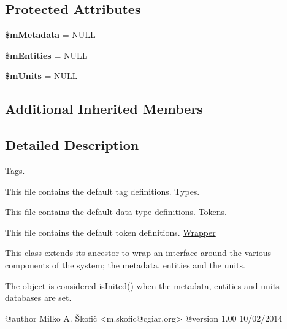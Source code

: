 \subsection*{Protected Attributes}
\begin{DoxyCompactItemize}
\item 
\hypertarget{class_ontology_wrapper_1_1_wrapper_a948081a4198321507da5b8e12976c606}{{\bfseries \$m\-Metadata} = N\-U\-L\-L}\label{class_ontology_wrapper_1_1_wrapper_a948081a4198321507da5b8e12976c606}

\item 
\hypertarget{class_ontology_wrapper_1_1_wrapper_afdfce5944ab839404cad14a166f7713b}{{\bfseries \$m\-Entities} = N\-U\-L\-L}\label{class_ontology_wrapper_1_1_wrapper_afdfce5944ab839404cad14a166f7713b}

\item 
\hypertarget{class_ontology_wrapper_1_1_wrapper_a7b23eb25ac51ad80722f7f8677e92202}{{\bfseries \$m\-Units} = N\-U\-L\-L}\label{class_ontology_wrapper_1_1_wrapper_a7b23eb25ac51ad80722f7f8677e92202}

\end{DoxyCompactItemize}
\subsection*{Additional Inherited Members}


\subsection{Detailed Description}
Tags.

This file contains the default tag definitions. Types.

This file contains the default data type definitions. Tokens.

This file contains the default token definitions. \hyperlink{class_ontology_wrapper_1_1_wrapper}{Wrapper}

This class extends its ancestor to wrap an interface around the various components of the system; the metadata, entities and the units.

The object is considered \hyperlink{}{is\-Inited()} when the metadata, entities and units databases are set. \begin{DoxyVerb} @author            Milko A. Škofič <m.skofic@cgiar.org>
 @version   1.00 10/02/2014\end{DoxyVerb}
 

